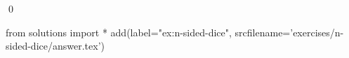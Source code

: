 
\begin{ex} 
  \label{ex:n-sided-dice}
  
  \qed
\end{ex} 
\begin{python0}
from solutions import *
add(label="ex:n-sided-dice",
    srcfilename='exercises/n-sided-dice/answer.tex') 
\end{python0}
